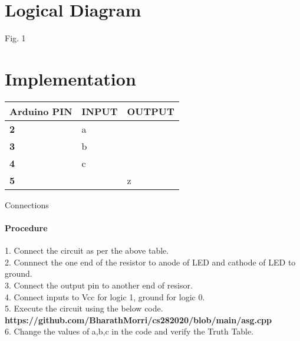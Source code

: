 \documentclass[journal,12pt,twocolumn]{IEEEtran}
\begin{document}
\section{Logical Diagram}
\begin{center}
Fig. 1 
\end{center}
\section{Implementation}
  \begin{tabularx}{0.46\textwidth} { 
  | >{\centering\arraybackslash}X 
  | >{\centering\arraybackslash}X 
  | >{\centering\arraybackslash}X  | }
\hline
\textbf{Arduino PIN} & \textbf{INPUT} & \textbf{OUTPUT} \\ 
\hline
\textbf 2 & a & \\
\hline
\textbf 3 & b & \\
\hline
\textbf 4 & c & \\
\hline
\textbf 5 & & z \\
\hline
\end{tabularx}
\begin{center}
    Connections
\end{center}
    \paragraph{Procedure}
    
    1. Connect the circuit as per the above table.\\
    2. Connnect the one end of the resistor to anode of LED and cathode of LED to ground.\\
    3. Connect the output pin to another end of resisor.\\
    4. Connect inputs to Vcc for logic 1, ground for logic 0.\\
    5. Execute the circuit using the below code.\\
   
   \textbf{https://github.com/BharathMorri/cs282020/blob/main/asg.cpp}\\
   
6. Change the values of a,b,c in the code and verify the Truth Table.\\

\end{document}
